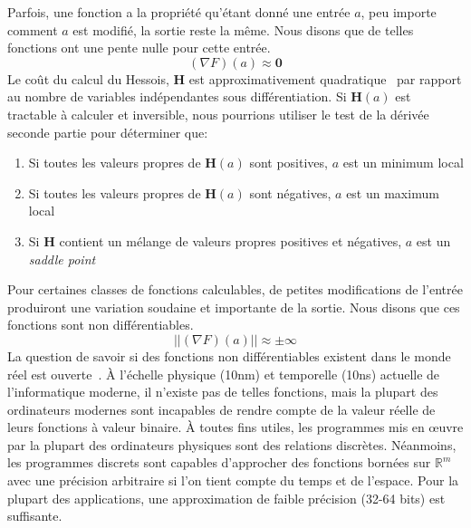 \noindent Parfois, une fonction a la propriété qu'étant donné une entrée $a$, peu importe comment $a$ est modifié, la sortie reste la même. Nous disons que de telles fonctions ont une pente nulle pour cette entrée.
%
\begin{equation}
    (\nabla F)(a) \approx \mathbf{0}
\end{equation}
%
Le coût du calcul du Hessois, $\mathbf{H}$ est approximativement quadratique~\citep{griewank1993some} par rapport au nombre de variables indépendantes sous différentiation. Si $\mathbf{H}(a)$ est tractable à calculer et inversible, nous pourrions utiliser le test de la dérivée seconde partie pour déterminer que:\\
%
\begin{enumerate}
\item Si toutes les valeurs propres de $\mathbf{H}(a)$ sont positives, $a$ est un minimum local
\item Si toutes les valeurs propres de $\mathbf{H}(a)$ sont négatives, $a$ est un maximum local
\item Si $\mathbf{H}$ contient un mélange de valeurs propres positives et négatives, $a$ est un \textit{saddle point}\\
\end{enumerate}
%
Pour certaines classes de fonctions calculables, de petites modifications de l'entrée produiront une variation soudaine et importante de la sortie. Nous disons que ces fonctions sont non différentiables.
%
\begin{equation}
    ||(\nabla F)(a)|| \approx \pm \infty
\end{equation}
%
La question de savoir si des fonctions non différentiables existent dans le monde réel est ouverte~\citep{buniy2005hilbert}. À l'échelle physique (10nm) et temporelle (10ns) actuelle de l'informatique moderne, il n'existe pas de telles fonctions, mais la plupart des ordinateurs modernes sont incapables de rendre compte de la valeur réelle de leurs fonctions à valeur binaire. À toutes fins utiles, les programmes mis en œuvre par la plupart des ordinateurs physiques sont des relations discrètes. Néanmoins, les programmes discrets sont capables d'approcher des fonctions bornées sur $\mathbb{R}^m$ avec une précision arbitraire si l'on tient compte du temps et de l'espace. Pour la plupart des applications, une approximation de faible précision (32-64 bits) est suffisante.

